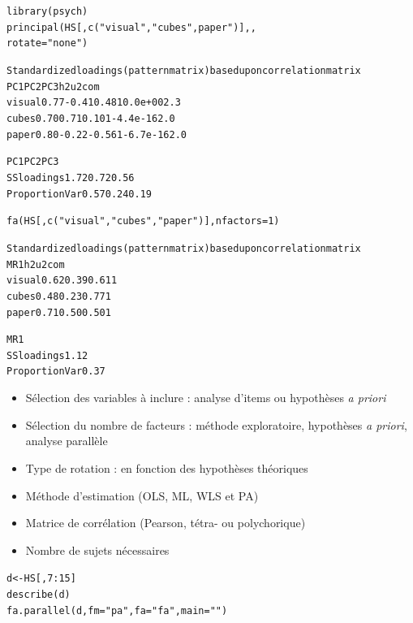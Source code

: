 \begin{alltt}
library(psych)
principal(HS[,c("visual","cubes", paper")], , 
          rotate = "none")
\end{alltt}
\begin{alltt}\small
Standardized loadings (pattern matrix) based upon correlation matrix
        PC1   PC2   PC3 h2       u2 com
visual 0.77 -0.41  0.48  1  0.0e+00 2.3
cubes  0.70  0.71  0.10  1 -4.4e-16 2.0 
paper  0.80 -0.22 -0.56  1 -6.7e-16 2.0

                       PC1  PC2  PC3
SS loadings           1.72 0.72 0.56
Proportion Var        0.57 0.24 0.19
\end{alltt}

\foilhead{}

\begin{alltt}
fa(HS[,c("visual", "cubes", "paper")], nfactors = 1)
\end{alltt}
\begin{alltt}\small
Standardized loadings (pattern matrix) based upon correlation matrix
        MR1   h2   u2 com
visual 0.62 0.39 0.61   1
cubes  0.48 0.23 0.77   1 
paper  0.71 0.50 0.50   1

                MR1
SS loadings    1.12
Proportion Var 0.37
\end{alltt}

\begin{itemize}
\item Sélection des variables à inclure : analyse d'items ou hypothèses \emph{a
    priori}
\item Sélection du nombre de facteurs : méthode exploratoire, hypothèses \emph{a
    priori}, analyse parallèle
\item Type de rotation : en fonction des hypothèses théoriques
\item Méthode d'estimation (OLS, ML, WLS et PA)
\item Matrice de corrélation (Pearson, tétra- ou polychorique)  
\item Nombre de sujets nécessaires \autocite{rouquette11}
\end{itemize}



\begin{alltt}
d <- HS[,7:15]
describe(d)
fa.parallel(d, fm = "pa", fa = "fa", main = "")
\end{alltt}

